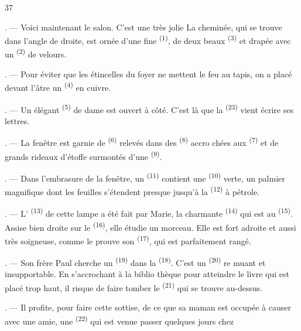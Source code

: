 \begin{VUpage}[39]{37}
\VUsaut{3.0mm}

. --- Voici maintenant le salon. C'est une très jolie\nl
{} La cheminée, qui se trouve dans l'angle de\nl
droite, est ornée d'une fine  \textsuperscript{(1)}, de deux\nl
beaux  \textsuperscript{(3)} et drapée avec un  \textsuperscript{(2)} de\nl
velours.

. --- Pour éviter que les étincelles du foyer ne\nl
mettent le feu au tapis, on a placé devant l'âtre un\nl
{} \textsuperscript{(4)} en cuivre.

. --- Un élégant  \textsuperscript{(5)} de dame est ouvert à\nl
côté. C'est là que la  \textsuperscript{(23)} vient\nl
écrire ses lettres.

. --- La fenêtre est garnie de \nl
{} \textsuperscript{(6)} relevés dans des  \textsuperscript{(8)} accro\cc
chées aux  \textsuperscript{(7)} et de grands rideaux d'étoffe\nl
surmontés d'une  \textsuperscript{(9)}.

. --- Dans l'embrasure de la fenêtre, un \cc
{} \textsuperscript{(11)} contient une  \textsuperscript{(10)} verte, un palmier\nl
magnifique dont les feuilles s'étendent presque jusqu'à\nl
la  \textsuperscript{(12)} à pétrole.

. --- L' \textsuperscript{(13)} de cette lampe a été fait par\nl
Marie, la charmante  \textsuperscript{(14)} qui est au\nl
{} \textsuperscript{(15)}. Assise bien droite sur le  \textsuperscript{(16)},\nl
elle étudie un morceau. Elle est fort adroite et aussi\nl
très soigneuse, comme le prouve son \nl
{} \textsuperscript{(17)}, qui est parfaitement rangé.

. --- Son frère Paul cherche un  \textsuperscript{(19)} dans la\nl
{} \textsuperscript{(18)}. C'est un  \textsuperscript{(20)} re\cc
muant et insupportable. En s'accrochant à la biblio\cc
thèque pour atteindre le livre qui est placé trop haut,\nl
il risque de faire tomber le  \textsuperscript{(21)} qui se trouve\nl
au-dessus.

. --- Il profite, pour faire cette sottise, de ce que sa\nl
maman est occupée à causer avec une amie, une\nl
{} \textsuperscript{(22)} qui est venue passer quelques jours chez
\parplein
\end{VUpage}


